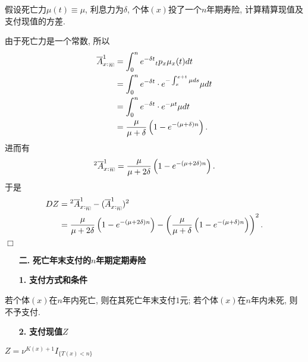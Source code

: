 \documentclass[a4paper,openany, 10pt]{ctexbook}
\makeatletter
\newcommand{\hei}{\CJKfamily{hei}}      %
\def\qed{\hfill$\Box$\medskip}
\DeclareRobustCommand{\annu}[1]{_{%
    \def\arraystretch{0}%
    \setlength\arraycolsep{1pt}%
    \setlength\arrayrulewidth{.2pt}%
    \begin{array}[b]{@{}c|}\hline
        \\[\arraycolsep]%
        \scriptstyle #1%
    \end{array}%
}}
\makeatother
\begin{document}
\begin{example}
    假设死亡力$\mu(t) \equiv \mu $, 利息力为$\delta$, 个体$(x)$投了一个$n$年期寿险, 计算精算现值及支付现值的方差.
\end{example}

\solution 由于死亡力是一个常数, 所以
\begin{align*}
    \overline{A}_{x:}^1{}_{\annu{n}} & = \int_0^n{e^{-\delta t}{}_tp_x\mu_x(t)dt}                        \\
                                & = \int_0^n{e^{-\delta t}\cdot e^{-\int_{x}^{x+t} \mu ds}\mu dt}   \\
                                & = \int_0^n{e^{-\delta t}\cdot e^{-\mu t}\mu dt}                   \\
                                & = \frac{\mu}{\mu + \delta} \left(1 - e^{-(\mu + \delta)n} \right).
\end{align*}
进而有
\begin{align*}
    ^2\overline{A}_{x:}^1{}_{\annu{n}}= \frac{\mu}{\mu + 2\delta} \left(1 - e^{-(\mu + 2\delta)n} \right).
\end{align*}
于是
\begin{align*}
    DZ& = {}^2\overline{A}_{x:\annu{n}}^1 - (\overline{A}_{x:\annu{n}}^1)^2\\
     &= \frac{\mu}{\mu + 2\delta} \left(1 - e^{-(\mu + 2\delta)n} \right) - \left(\frac{\mu}{\mu + \delta} \left(1 - e^{-(\mu + \delta)n} \right)\right)^2.
\end{align*}
\qed

\begin{itemize}
    \item[{\bf\hei 二.}]{\bf\hei 死亡年末支付的$n$年期定期寿险}
\end{itemize}
\begin{itemize}
    \item[{\bf\hei 1.}]{\bf\hei 支付方式和条件}
\end{itemize}

若个体$(x)$在$n$年内死亡, 则在其死亡年末支付$1$元; 若个体$(x)$在$n$年内未死, 则不予支付.

\begin{itemize}
    \item[{\bf\hei 2.}]{\bf\hei 支付现值$Z$}
\end{itemize}

$Z=\nu^{K(x)+1}I_{\{T(x)<n\}}$
\end{document}
